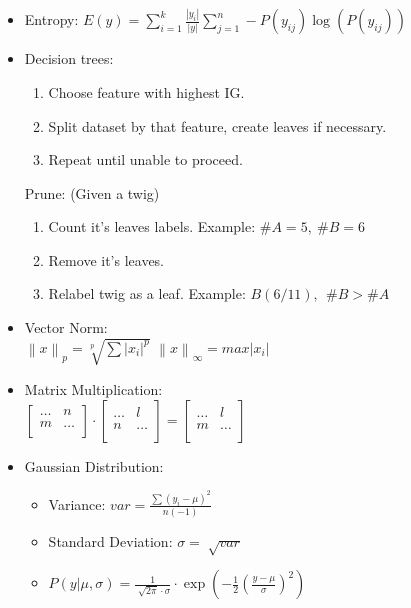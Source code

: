 \documentclass[twocolumn, 10pt]{article}
\begin{document}
\begin{itemize}[leftmargin=*, itemsep=0pt]
    \item Entropy: $\displaystyle E(y)=\sum_{i=1}^{k} \frac{|y_i|}{|y|}
                                       \sum_{j=1}^{n} -P(y_{ij})\log(P(y_{ij}))$

    \item Decision trees:
    \begin{enumerate}[topsep=0pt, itemsep=0pt]
        \item Choose feature with highest IG.
        \item Split dataset by that feature, create leaves if necessary.
        \item Repeat until unable to proceed.
    \end{enumerate}
    Prune: (Given a twig)
    \begin{enumerate}[topsep=0pt, itemsep=0pt]
        \item Count it's leaves labels. \; Example: $\#A=5, \ \#B=6$
        \item Remove it's leaves.
        \item Relabel twig as a leaf. \; Example: $B(6/11), \ \ \#B>\#A$ 
    \end{enumerate}

    \item Vector Norm: \\[2pt]
    $\displaystyle\left\lVert x\right\rVert _p=\sqrt[p]{\sum\left\lvert x_i\right\rvert ^p}$ \;\;\;\;\; $\displaystyle\left\lVert x\right\rVert _\infty=max \left\lvert x_i\right\rvert$

    \newpage
    \item Matrix Multiplication: \\[3pt]
    $\begin{bmatrix}
        \ldots & n \\
        m & \ldots \\
    \end{bmatrix} \cdot
    \begin{bmatrix}
        \ldots & l \\
        n & \ldots \\
    \end{bmatrix} =
    \begin{bmatrix}
        \ldots  & l \\
        m  & \ldots \\
    \end{bmatrix}$

    \item Gaussian Distribution:
    \begin{itemize}[topsep=0pt]
        \item Variance: $\displaystyle var=\frac{\sum(y_i-\mu)^2}{n(-1)}$
        \item Standard Deviation: $\displaystyle \sigma=\sqrt[]{var}$
        \item $\displaystyle  P(y|\mu,\sigma)=\frac{1}{\sqrt[]{2\pi}\cdot\sigma}\cdot\exp\left(-\frac{1}{2}\left(\frac{y-\mu}{\sigma}\right)^2\right)$
    \end{itemize}


\end{itemize}
\end{document}
